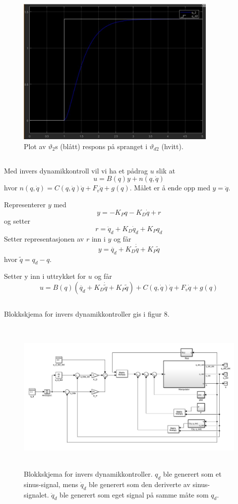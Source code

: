 \documentclass[norsk]{article}
\begin{document}
\begin{figure}[H]
\includegraphics[height=7.2cm]{illustrations/oppg3c_illu2}
\caption{Plot av \(\vartheta_2\)s (blått) respons på spranget i \(\vartheta_{d2}\) (hvitt).}
\end{figure}
\subsection{ }
Med invers dynamikkontroll vil vi ha et pådrag \(u\) slik at
\[u = B(q)y + n(q, \dot{q})\]
hvor \(n(q, \dot{q}) = C(q, \dot{q})\dot{q}+F_v\dot{q} + g(q)\). Målet er å ende opp med \(y = \ddot{q}\).

Representerer \(y\) med
\[y = -K_Pq -K_D\dot{q} + r\]
og setter
\[r = \ddot{q}_d + K_D\dot{q}_d + K_Pq_d\]
Setter representasjonen av \(r\) inn i \(y\) og får
\[y = \ddot{q_d} + K_D\dot{\tilde{q}} + K_P\tilde{q}\]
hvor \(\tilde{q} = q_d - q\).

Setter y inn i uttrykket for \(u\) og får
\[u = B(q)(\ddot{q_d} + K_D\dot{\tilde{q}} + K_P\tilde{q}) + C(q, \dot{q})\dot{q}+F_v\dot{q} + g(q)\]
\subsection{ }
Blokkskjema for invers dynamikkontroller gis i figur 8.
\begin{figure}[H]
\includegraphics[height=7.5cm]{illustrations/oppg3e_illu1}
\caption{Blokkskjema for invers dynamikkontroller. \(q_d\) ble generert som et sinus-signal, mens \(\dot{q}_d\) ble generert som den deriverte av sinus-signalet. \(\ddot{q}_d\) ble generert som eget signal på samme måte som \(q_d\).}
\end{figure}
\end{document}
